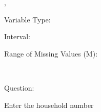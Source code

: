 \documentclass[
]{article}
\begin{document}
,

\begin{minipage}[t]{0.3\linewidth}

\colorbox{mypink1}{}

\end{minipage}%
\begin{minipage}[t]{0.7\linewidth}

\colorbox{mypink1}{\makebox[\textwidth]{\strut\bfseries\color{black}  
 }}

\end{minipage}

\begin{minipage}[t]{0.3\linewidth}

Variable Type:

\end{minipage}%
\begin{minipage}[t]{0.7\linewidth}

\end{minipage}

\begin{minipage}[t]{0.3\linewidth}

Interval:

\end{minipage}%
\begin{minipage}[t]{0.7\linewidth}

\end{minipage}

\begin{minipage}[t]{0.3\linewidth}

Range of Missing Values (M):

\end{minipage}%
\begin{minipage}[t]{0.7\linewidth}

~

\end{minipage}

\begin{minipage}[t]{0.3\linewidth}

Question:

\end{minipage}%
\begin{minipage}[t]{0.7\linewidth}

Enter the household number

\end{minipage}
\end{document}
